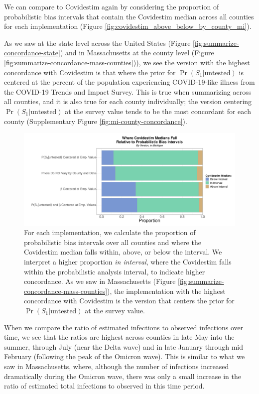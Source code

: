 \documentclass[12pt,twoside]{smiththesis}
\begin{document}
We can compare to Covidestim again by considering the proportion of probabilistic bias intervals that contain the Covidestim median across all counties for each implementation (Figure \ref{fig:covidestim_above_below_by_county_mi}).

As we saw at the state level across the United States (Figure \ref{fig:summarize-concordance-state}) and in
Massachusetts at the county level (Figure \ref{fig:summarize-concordance-mass-counties})), we see the version with the highest concordance with Covidestim is that where the prior for \(\Pr(S_1|\text{untested})\) is centered at the percent of the population experiencing COVID-19-like illness from the COVID-19 Trends and Impact Survey. This is true when summarizing across all counties, and it is also true for each county individually; the version centering \(\Pr(S_1|\text{untested})\) at the survey value tends to be the most concordant for each county (Supplementary Figure \ref{fig:mi-county-concordance}).
\begin{figure}
\includegraphics[width=1\linewidth]{figure/summarize-concordance-mich-counties} \caption{\label{fig:covidestim_above_below_by_county_mi} For each implementation, we calculate the proportion of probabilistic bias intervals over all counties and where the Covidestim median falls within, above, or below the interval. We interpret a higher proportion \emph{in interval}, where the Covidestim falls within the probabilistic analysis interval, to indicate higher concordance. As we saw in Massachusetts (Figure \ref{fig:summarize-concordance-mass-counties}), the implementation with the highest concordance with Covidestim is the version that centers the prior for $\Pr(S_1|\text{untested})$ at the survey value.}\label{fig:unnamed-chunk-85}
\end{figure}
When we compare the ratio of estimated infections to observed infections over time, we see that the ratios are highest across counties in late May into the summer, through July (near the Delta wave) and in late January through mid February (following the peak of the Omicron wave). This is similar to what we saw in Massachusetts, where, although the number of infections increased dramatically during the Omicron wave, there was only a small increase in the ratio of estimated total infections to observed in this time period.
\end{document}
